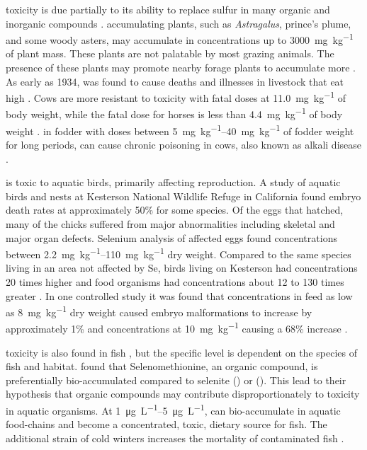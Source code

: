 \begin{linenumbers}[1]
\Se toxicity is due partially to its ability to replace sulfur in many organic and inorganic compounds \parencite{Besser1989}.  \Se accumulating plants, such as \textit{Astragalus}, prince's plume, and some woody asters, may accumulate \Se in concentrations up to \SI{3000}{\milli\g\per\kilo\g} of plant mass.  These plants are not palatable by most grazing animals.  The presence of these plants may promote nearby forage plants to accumulate more \Se \parencite{2006USDA}.  As early as 1934, \Se was found to cause deaths and illnesses in livestock that eat high \Se \parencite{scott1973,Rohwer1931,Besser1989,2006USDA}.  Cows are more resistant to \Se toxicity with fatal doses at \SI{11.0}{\milli\g\per\kilo\g} of body weight, while the fatal dose for horses is less than \SI{4.4}{\milli\g\per\kilo\g} of body weight \parencite{Painter1940}.  \Se in fodder with doses between \SIrange{5}{40}{\milli\g\per\kilo\g} of fodder weight for long periods, can cause chronic poisoning in cows, also known as alkali disease \parencite{2006USDA}.

\Se is toxic to aquatic birds, primarily affecting reproduction.  A study of aquatic birds and nests at Kesterson National Wildlife Refuge in California found embryo death rates at approximately 50\% for some species.  Of the eggs that hatched, many of the chicks suffered from major abnormalities including skeletal and major organ defects.  Selenium analysis of affected eggs found concentrations between \SIrange{2.2}{110}{\milli\g\per\kilo\g} dry weight.  Compared to the same species living in an area not affected by Se, birds living on Kesterson had \Se concentrations 20 times higher and food organisms had \Se concentrations about 12 to 130 times greater \parencite{Ohlendorf1986}.  In one controlled study it was found that \Se concentrations in feed as low as \SI{8}{\milli\g\per\kilo\g} dry weight caused embryo malformations to increase by approximately 1\% and concentrations at  \SI{10}{\milli\g\per\kilo\g} causing a 68\% increase \parencite{2002Spallholz}.

\Se toxicity is also found in fish \parencite{gillespie1986,Lemly1988}, but the specific level is dependent on the species of fish and habitat.  \textcite{Besser1989} found that Selenomethionine, an organic \Se compound, is preferentially bio-accumulated compared to selenite (\selenite) or  (\selenate).  This lead to their hypothesis that organic \Se compounds may contribute disproportionately to toxicity in aquatic organisms.  At \SIrange{1}{5}{\micro\g\per\liter}, \Se can bio-accumulate in aquatic food-chains and become a concentrated, toxic, dietary source for fish.  The additional strain of cold winters increases the mortality of \Se contaminated fish \parencite{Lemly1993}.  


\end{linenumbers}

